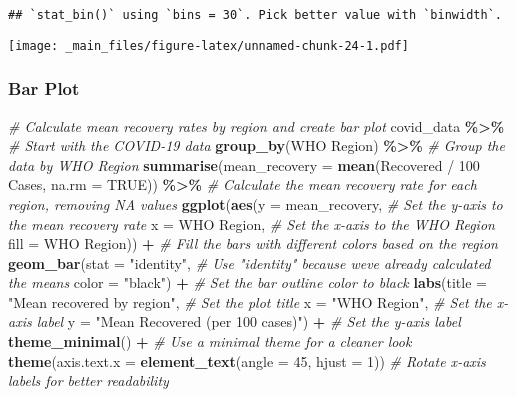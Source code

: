 \documentclass[
]{book}
\newenvironment{Shaded}{\begin{snugshade}}{\end{snugshade}}
\newcommand{\AttributeTok}[1]{\textcolor[rgb]{0.13,0.29,0.53}{#1}}
\newcommand{\CommentTok}[1]{\textcolor[rgb]{0.56,0.35,0.01}{\textit{#1}}}
\newcommand{\ConstantTok}[1]{\textcolor[rgb]{0.56,0.35,0.01}{#1}}
\newcommand{\DecValTok}[1]{\textcolor[rgb]{0.00,0.00,0.81}{#1}}
\newcommand{\FunctionTok}[1]{\textcolor[rgb]{0.13,0.29,0.53}{\textbf{#1}}}
\newcommand{\NormalTok}[1]{#1}
\newcommand{\SpecialCharTok}[1]{\textcolor[rgb]{0.81,0.36,0.00}{\textbf{#1}}}
\newcommand{\StringTok}[1]{\textcolor[rgb]{0.31,0.60,0.02}{#1}}
\begin{document}
\begin{verbatim}
## `stat_bin()` using `bins = 30`. Pick better value with `binwidth`.
\end{verbatim}

\texttt{[image: \_main\_files/figure-latex/unnamed-chunk-24-1.pdf]}

\subsubsection{Bar Plot}\label{bar-plot}

\begin{Shaded}
\begin{Highlighting}[]
\CommentTok{\# Calculate mean recovery rates by region and create bar plot}
\NormalTok{covid\_data }\SpecialCharTok{\%\textgreater{}\%} \CommentTok{\# Start with the COVID{-}19 data}
  \FunctionTok{group\_by}\NormalTok{(}\StringTok{\textasciigrave{}}\AttributeTok{WHO Region}\StringTok{\textasciigrave{}}\NormalTok{) }\SpecialCharTok{\%\textgreater{}\%} \CommentTok{\# Group the data by WHO Region}
  \FunctionTok{summarise}\NormalTok{(}\AttributeTok{mean\_recovery =} \FunctionTok{mean}\NormalTok{(}\StringTok{\textasciigrave{}}\AttributeTok{Recovered / 100 Cases}\StringTok{\textasciigrave{}}\NormalTok{, }\AttributeTok{na.rm =} \ConstantTok{TRUE}\NormalTok{)) }\SpecialCharTok{\%\textgreater{}\%} \CommentTok{\# Calculate the mean recovery rate for each region, removing NA values}
  \FunctionTok{ggplot}\NormalTok{(}\FunctionTok{aes}\NormalTok{(}\AttributeTok{y =}\NormalTok{ mean\_recovery, }\CommentTok{\# Set the y{-}axis to the mean recovery rate}
             \AttributeTok{x =} \StringTok{\textasciigrave{}}\AttributeTok{WHO Region}\StringTok{\textasciigrave{}}\NormalTok{, }\CommentTok{\# Set the x{-}axis to the WHO Region}
             \AttributeTok{fill =} \StringTok{\textasciigrave{}}\AttributeTok{WHO Region}\StringTok{\textasciigrave{}}\NormalTok{)) }\SpecialCharTok{+} \CommentTok{\# Fill the bars with different colors based on the region}
  \FunctionTok{geom\_bar}\NormalTok{(}\AttributeTok{stat =} \StringTok{"identity"}\NormalTok{, }\CommentTok{\# Use "identity" because we\textquotesingle{}ve already calculated the means}
           \AttributeTok{color =} \StringTok{"black"}\NormalTok{) }\SpecialCharTok{+} \CommentTok{\# Set the bar outline color to black}
  \FunctionTok{labs}\NormalTok{(}\AttributeTok{title =} \StringTok{"Mean recovered by region"}\NormalTok{, }\CommentTok{\# Set the plot title}
       \AttributeTok{x =} \StringTok{"WHO Region"}\NormalTok{, }\CommentTok{\# Set the x{-}axis label}
       \AttributeTok{y =} \StringTok{"Mean Recovered (per 100 cases)"}\NormalTok{) }\SpecialCharTok{+} \CommentTok{\# Set the y{-}axis label}
  \FunctionTok{theme\_minimal}\NormalTok{() }\SpecialCharTok{+} \CommentTok{\# Use a minimal theme for a cleaner look}
  \FunctionTok{theme}\NormalTok{(}\AttributeTok{axis.text.x =} \FunctionTok{element\_text}\NormalTok{(}\AttributeTok{angle =} \DecValTok{45}\NormalTok{, }\AttributeTok{hjust =} \DecValTok{1}\NormalTok{)) }\CommentTok{\# Rotate x{-}axis labels for better readability}
\end{Highlighting}
\end{Shaded}
\end{document}
